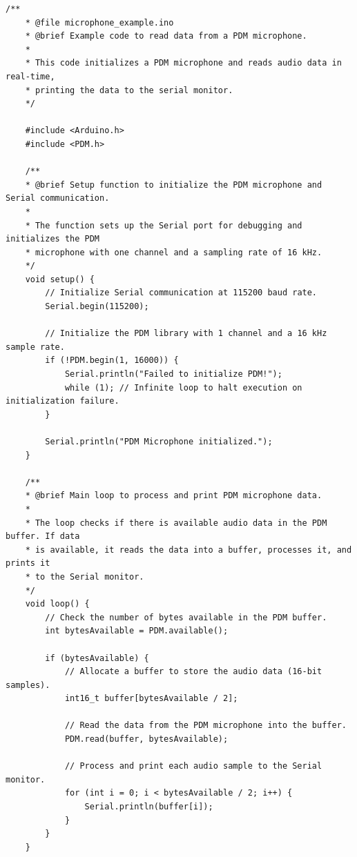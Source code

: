 \begin{lstlisting}[caption={Code with simple example}, label={lst:simple_example}]
	/**
	* @file microphone_example.ino
	* @brief Example code to read data from a PDM microphone.
	* 
	* This code initializes a PDM microphone and reads audio data in real-time,
	* printing the data to the serial monitor.
	*/
	
	#include <Arduino.h>
	#include <PDM.h>
	
	/**
	* @brief Setup function to initialize the PDM microphone and Serial communication.
	* 
	* The function sets up the Serial port for debugging and initializes the PDM
	* microphone with one channel and a sampling rate of 16 kHz.
	*/
	void setup() {
		// Initialize Serial communication at 115200 baud rate.
		Serial.begin(115200);
		
		// Initialize the PDM library with 1 channel and a 16 kHz sample rate.
		if (!PDM.begin(1, 16000)) {
			Serial.println("Failed to initialize PDM!");
			while (1); // Infinite loop to halt execution on initialization failure.
		}
		
		Serial.println("PDM Microphone initialized.");
	}
	
	/**
	* @brief Main loop to process and print PDM microphone data.
	* 
	* The loop checks if there is available audio data in the PDM buffer. If data
	* is available, it reads the data into a buffer, processes it, and prints it
	* to the Serial monitor.
	*/
	void loop() {
		// Check the number of bytes available in the PDM buffer.
		int bytesAvailable = PDM.available();
		
		if (bytesAvailable) {
			// Allocate a buffer to store the audio data (16-bit samples).
			int16_t buffer[bytesAvailable / 2];
			
			// Read the data from the PDM microphone into the buffer.
			PDM.read(buffer, bytesAvailable);
			
			// Process and print each audio sample to the Serial monitor.
			for (int i = 0; i < bytesAvailable / 2; i++) {
				Serial.println(buffer[i]);
			}
		}
	}
\end{lstlisting}


